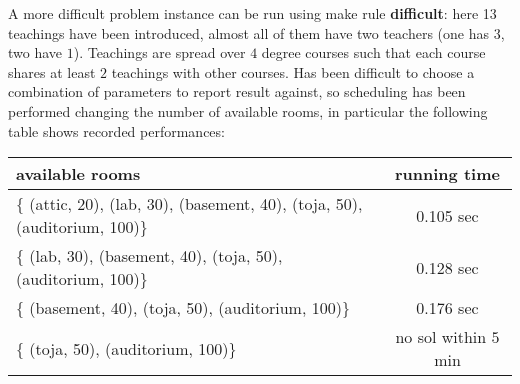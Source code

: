\documentclass[10pt,a4paper]{article} %
\begin{document}
    A more difficult problem instance can be run using make rule \textbf{difficult}:
    here 13 teachings have been introduced, almost all of them have two teachers
    (one has $3$, two have $1$). Teachings are spread over $4$ degree courses
    such that each course shares at least $2$ teachings with other courses.
    Has been difficult to choose a combination of parameters to report result against,
    so scheduling has been performed changing the number of available rooms,
    in particular the following table shows recorded performances:

    \begin{center}
        \begin{tabular}{p{6cm} | c}
            \textbf{available rooms} & \textbf{running time} \\
            \hline
            $ \lbrace $ (attic, 20), (lab, 30), (basement, 40),
                (toja, 50), (auditorium, 100)$ \rbrace $ & 0.105 sec \\
            \hline
            $ \lbrace $ (lab, 30), (basement, 40),
                (toja, 50), (auditorium, 100)$ \rbrace $ & 0.128 sec\\
            \hline
            $ \lbrace $ (basement, 40),
                (toja, 50), (auditorium, 100)$ \rbrace $ & 0.176 sec \\
            \hline
            $ \lbrace $ (toja, 50), (auditorium, 100)$ \rbrace $ & no sol within $5$ min
        \end{tabular}
    \end{center}
\end{document}
